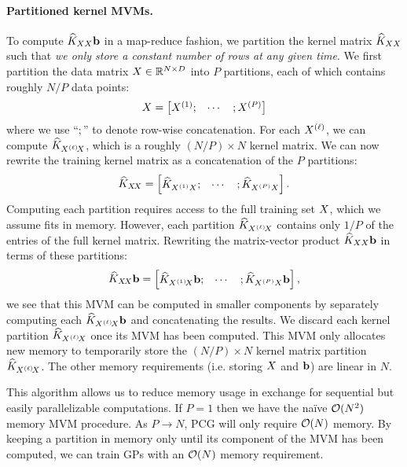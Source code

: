 \paragraph{Partitioned kernel MVMs.}
To compute $\widehat{K}_{XX} \mathbf{b}$ in a map-reduce fashion, we partition the kernel matrix $\widehat{K}_{XX}$ such that \textit{we only store a constant number of rows at any given time}.
We first partition the data matrix $X \in \mathbb{R}^{N \times D}$ into $P$ partitions, each of which contains roughly $N/P$ data points:
%
\[
  X = \begin{bmatrix}
    X^{(1)}; &
    \cdots &
    ; X^{(P)}
  \end{bmatrix}
\]
%
where we use ``$;$'' to denote row-wise concatenation.
For each $X^{(\ell)}$, we can compute $\widehat {K}_{X^{(\ell)}\!X}$, which is a roughly $(N / P) \times N$ kernel matrix.
We can now rewrite the training kernel matrix as a concatenation of the $P$ partitions:
%
\[
  \widehat {K}_{X\!X} = \begin{bmatrix}
      \widehat {K}_{X^{(1)}X}; &
    \cdots &
    ; \widehat {K}_{X^{(P)}X}
  \end{bmatrix}.
\]
%
Computing each partition requires access to the full training set $X$, which we assume fits in memory.
However, each partition $\widehat {K}_{X^{(\ell)}\!X}$ contains only $1/P$ of the entries of the full kernel matrix.
Rewriting the matrix-vector product $\widehat{K}_{XX} \mathbf{b}$ in terms of these partitions:
%
\[
  \widehat {K}_{X\!X} \mathbf{b} = \begin{bmatrix}
    \widehat {K}_{X^{(1)}\!X} \mathbf{b}; &
    \cdots &
    ; \widehat {K}_{X^{(P)}X} \mathbf{b}
  \end{bmatrix},
\]
%
we see that this MVM can be computed in smaller components by separately computing each $\widehat {K}_{X^{(\ell)}\!X} \mathbf{b}$ and concatenating the results.
We discard each kernel partition $\widehat {K}_{X^{(\ell)}\!X}$ once its MVM has been computed.
This MVM only allocates new memory to temporarily store the $(N / P) \times N$ kernel matrix partition $\widehat {K}_{X^{(\ell)}\!X}$.
The other memory requirements (i.e. storing $X$ and $\mathbf{b}$) are linear in $N$.

This algorithm allows us to reduce memory usage in exchange for sequential but easily parallelizable computations.
If $P=1$ then we have the na\"ive $\bigo{N^2}$ memory MVM procedure. As $P \to N$, PCG will only require $\bigo{N}$ memory.
By keeping a partition in memory only until its component of the MVM has been computed, we can train GPs with an $\bigo{N}$ memory requirement.

